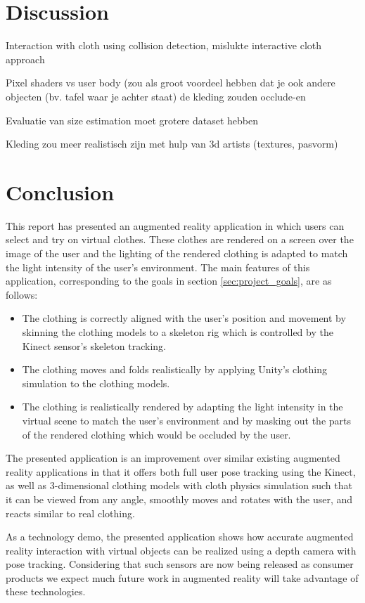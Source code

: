 \documentclass[a4paper]{article}
\begin{document}
\section{Discussion}
\label{sec:discussion}

Interaction with cloth using collision detection, mislukte interactive cloth approach

Pixel shaders vs user body (zou als groot voordeel hebben dat je ook andere objecten (bv. tafel waar je achter staat) de kleding zouden occlude-en

Evaluatie van size estimation moet grotere dataset hebben

Kleding zou meer realistisch zijn met hulp van 3d artists (textures, pasvorm)

\section{Conclusion}
\label{sec:conclusion}

This report has presented an augmented reality application in which users can select and try on virtual clothes. These clothes are rendered on a screen over the image of the user and the lighting of the rendered clothing is adapted to match the light intensity of the user's environment. The main features of this application, corresponding to the goals in section \ref{sec:project_goals}, are as follows:
\begin{itemize}
\item The clothing is correctly aligned with the user's position and movement by skinning the clothing models to a skeleton rig which is controlled by the Kinect sensor's skeleton tracking.
\item The clothing moves and folds realistically by applying Unity's clothing simulation to the clothing models.
\item The clothing is realistically rendered by adapting the light intensity in the virtual scene to match the user's environment and by masking out the parts of the rendered clothing which would be occluded by the user.
\end{itemize}

The presented application is an improvement over similar existing augmented reality applications in that it offers both full user pose tracking using the Kinect, as well as 3-dimensional clothing models with cloth physics simulation such that it can be viewed from any angle, smoothly moves and rotates with the user, and reacts similar to real clothing.

As a technology demo, the presented application shows how accurate augmented reality interaction with virtual objects can be realized using a depth camera with pose tracking. Considering that such sensors are now being released as consumer products we expect much future work in augmented reality will take advantage of these technologies.
\end{document}
